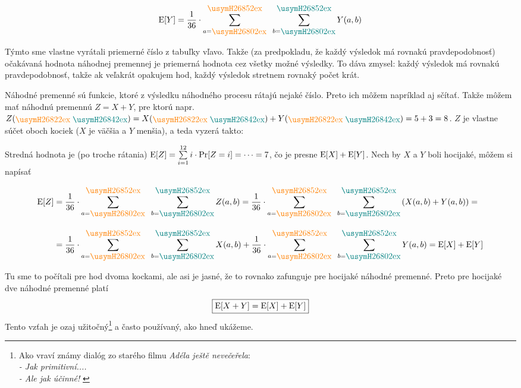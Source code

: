 {$$\ev{Y}=\frac{1}{36}\cdot\sum_{a=\tmp[orange]1}^{\tmp[orange]6}\;\;\sum_{b=\tmp[teal]1}^{\tmp[teal]6}Y(a,b)$$

Týmto sme vlastne vyrátali priemerné číslo z tabuľky vľavo.
Takže (za predpokladu, že každý výsledok má rovnakú pravdepodobnosť) očakávaná hodnota náhodnej
premennej je priemerná hodnota cez všetky možné výsledky. To dáva zmysel: každý výsledok má rovnakú
pravdepodobnosť, takže ak veľakrát opakujem hod, každý výsledok stretnem rovnaký počet krát.


Náhodné premenné sú funkcie, ktoré z výsledku náhodného procesu rátajú nejaké číslo. Preto
ich môžem napríklad aj sčítať. Takže môžem mať náhodnú premennú $Z=X+Y$, pre ktorú napr.
$Z(\tmp[orange]3\;\tmp[teal]5)=X(\tmp[orange]3\;\tmp[teal]5)+Y(\tmp[orange]3\;\tmp[teal]5)=5+3=8$.
$Z$ je vlastne súčet oboch kociek ($X$ je väčšia a $Y$ menšia), a teda vyzerá takto:\\

\def\fnZ#1#2{%
 \pgfmathtruncatemacro{\res}{#1+#2}
 \def\clr{\ifcase\res\relax\or\relax\or 
 yellow\or orange\or red\or magenta\or blue\or green\or
 yellow\or orange\or red\or magenta\or blue\else green
 \fi}
}



Stredná hodnota je (po troche rátania) $\text{E}[Z]=\sum\limits_{i=1}^{12}i\cdot\text{Pr}[Z=i]=\cdots=7$, 
čo je presne $\text{E}[X]+\text{E}[Y]$. Nech by $X$ a $Y$ boli hocijaké, môžem si napísať

\begin{align*}
  \ev{Z}&=
\frac{1}{36}\cdot\sum_{a=\tmp[orange]1}^{\tmp[orange]6}\;\;\sum_{b=\tmp[teal]1}^{\tmp[teal]6}Z(a,b)=
\frac{1}{36}\cdot\sum_{a=\tmp[orange]1}^{\tmp[orange]6}\;\;\sum_{b=\tmp[teal]1}^{\tmp[teal]6}
  \left(X(a,b)+Y(a,b)\right)=\\[2ex]
  &=\frac{1}{36}\cdot\sum_{a=\tmp[orange]1}^{\tmp[orange]6}\;\;\sum_{b=\tmp[teal]1}^{\tmp[teal]6}X(a,b)+
\frac{1}{36}\cdot\sum_{a=\tmp[orange]1}^{\tmp[orange]6}\;\;\sum_{b=\tmp[teal]1}^{\tmp[teal]6}Y(a,b)=
\ev{X}+\ev{Y}
\end{align*}

Tu sme to počítali pre hod dvoma kockami, ale asi je jasné, že to rovnako zafunguje pre hocijaké
náhodné premenné. Preto pre hocijaké dve náhodné premenné platí 
\begin{equation*}\boxed{\text{E}[X+Y]=\text{E}[X]+\text{E}[Y]}\end{equation*}
Tento vzťah  je ozaj užitočný\footnote{%
    Ako vraví známy dialóg zo starého filmu {\em Adéla ještě nevečeřela}:\\
    {\em 
    - Jak primitivní....\\
    - Ale jak účinné!
    }
} a často používaný, ako hneď ukážeme.


}
